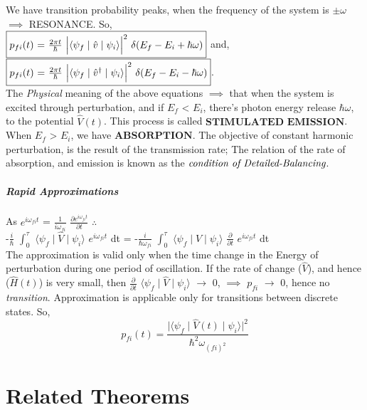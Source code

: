 \documentclass[a4paper, 10pt, onepage]{elegantbook}
\begin{document}
{We have transition probability peaks, when the frequency of the system is $\pm \omega$ $\implies$ RESONANCE. So,  \\
$\boxed{p_{fi} (t)$ = $\frac{2 \pi t}{\hbar}$ $\Big| \langle \psi_{f} \mid \hat{v} \mid \psi_{i} \rangle \Big|^2$ $\delta(E_f - E_i + \hbar \omega)}$
and,
$\boxed{p_{fi} (t)$ = $\frac{2 \pi t}{\hbar}$ $\Big| \langle \psi_f \mid \hat{v}^{\dagger} \mid \psi_{i} \rangle \Big|^2$ $\delta(E_f - E_i - \hbar \omega)}$.  \\
The \emph{Physical} meaning of the above equations $\implies$ that when the system is excited through perturbation, and if $E_f$ < $E_i$, there's photon energy release $\hbar \omega$, to the potential $\hat V (t)$. This process is called $\mathbf{\textbf{STIMULATED EMISSION}}$. When $E_f$ > $E_i$, we have $\mathbf{\textbf{ABSORPTION}}$. The objective of constant harmonic perturbation, is the result of the transmission rate; The relation of the rate of absorption, and emission is known as the $\emph{condition of Detailed-Balancing}$.

\paragraph{Rapid Approximations}
\noindent

As $e^{i \omega_{fi} t}$ = $\frac{1}{i \omega_{fi}}$ $\frac{\partial e^{i \omega_{fi} t}}{\partial t}$ $\therefore$ \\
-$\frac{i}{\hbar}$ $\int_0^{\tau}$ $\langle \psi_f \mid \hat V \mid \psi_i \rangle$ $e^{i \omega_{fi} t}$ dt = -$\frac{i}{\hbar \omega_{fi}}$ $\int_0^{\tau}$ $\langle \psi_f \mid \hat V \mid \psi_i \rangle$ $\frac{\partial}{\partial t}$ $e^{i \omega_{fi} t}$ dt  \\
The approximation is valid only when the time change in the Energy of perturbation during one period of oscillation. If the rate of change ($\hat V$), and hence ($\hat H(t)$) is very small, then $\frac{\partial}{\partial t}$ $\langle \psi_f \mid \hat V \mid \psi_i \rangle$ $\rightarrow$ 0, $\implies$ $p_{fi}$ $\rightarrow$ 0, hence no \emph{transition}. Approximation is applicable only for transitions between discrete states.
So,
\begin{equation}
p_{fi} (t) = \frac{\Big| \langle \psi_f \mid \hat V (t) \mid \psi_i \rangle \Big|^2}{\hbar^2 \omega_{(fi)^2}}
\end{equation}


\chapter{Related Theorems}
}
\end{document}
